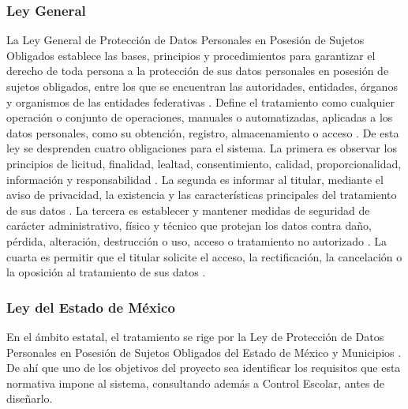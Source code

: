\subsubsection{Ley General}
La Ley General de Protección de Datos Personales en Posesión de Sujetos
Obligados establece las bases, principios y procedimientos para garantizar el
derecho de toda persona a la protección de sus datos personales en posesión de
sujetos obligados, entre los que se encuentran las autoridades, entidades,
órganos y organismos de las entidades federativas
\parencite[art.~2, fracs.~I y V]{lgpdppso2025}. Define el tratamiento como
cualquier operación o conjunto de operaciones, manuales o automatizadas,
aplicadas a los datos personales, como su obtención, registro, almacenamiento
o acceso \parencite[art.~3, frac.~XXXI]{lgpdppso2025}. De esta ley se
desprenden cuatro obligaciones para el sistema. La primera es observar los
principios de licitud, finalidad, lealtad, consentimiento, calidad,
proporcionalidad, información y responsabilidad
\parencite[art.~10]{lgpdppso2025}. La segunda es informar al titular, mediante
el aviso de privacidad, la existencia y las características principales del
tratamiento de sus datos \parencite[art.~20]{lgpdppso2025}. La tercera es
establecer y mantener medidas de seguridad de carácter administrativo, físico
y técnico que protejan los datos contra daño, pérdida, alteración, destrucción
o uso, acceso o tratamiento no autorizado \parencite[art.~25]{lgpdppso2025}.
La cuarta es permitir que el titular solicite el acceso, la rectificación, la
cancelación o la oposición al tratamiento de sus datos
\parencite[art.~37]{lgpdppso2025}.

\subsubsection{Ley del Estado de México}
En el ámbito estatal, el tratamiento se rige por la Ley de Protección de Datos
Personales en Posesión de Sujetos Obligados del Estado de México y Municipios
\parencite{edomex2017datos}. De ahí que uno de los objetivos del proyecto sea
identificar los requisitos que esta normativa impone al sistema, consultando
además a Control Escolar, antes de diseñarlo.
